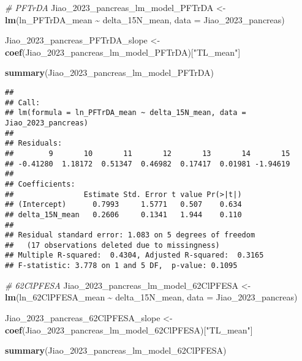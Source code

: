 \documentclass[
]{article}
\newenvironment{Shaded}{\begin{snugshade}}{\end{snugshade}}
\newcommand{\AttributeTok}[1]{\textcolor[rgb]{0.13,0.29,0.53}{#1}}
\newcommand{\CommentTok}[1]{\textcolor[rgb]{0.56,0.35,0.01}{\textit{#1}}}
\newcommand{\FunctionTok}[1]{\textcolor[rgb]{0.13,0.29,0.53}{\textbf{#1}}}
\newcommand{\NormalTok}[1]{#1}
\newcommand{\OtherTok}[1]{\textcolor[rgb]{0.56,0.35,0.01}{#1}}
\newcommand{\SpecialCharTok}[1]{\textcolor[rgb]{0.81,0.36,0.00}{\textbf{#1}}}
\newcommand{\StringTok}[1]{\textcolor[rgb]{0.31,0.60,0.02}{#1}}
\begin{document}
\begin{Shaded}
\begin{Highlighting}[]
\CommentTok{\# PFTrDA}
\NormalTok{Jiao\_2023\_pancreas\_lm\_model\_PFTrDA }\OtherTok{\textless{}{-}} \FunctionTok{lm}\NormalTok{(ln\_PFTrDA\_mean }\SpecialCharTok{\textasciitilde{}}\NormalTok{ delta\_15N\_mean,}
                                    \AttributeTok{data =}\NormalTok{ Jiao\_2023\_pancreas)}

\NormalTok{Jiao\_2023\_pancreas\_PFTrDA\_slope }\OtherTok{\textless{}{-}} \FunctionTok{coef}\NormalTok{(Jiao\_2023\_pancreas\_lm\_model\_PFTrDA)[}\StringTok{"TL\_mean"}\NormalTok{]}


\FunctionTok{summary}\NormalTok{(Jiao\_2023\_pancreas\_lm\_model\_PFTrDA)}
\end{Highlighting}
\end{Shaded}

\begin{verbatim}
## 
## Call:
## lm(formula = ln_PFTrDA_mean ~ delta_15N_mean, data = Jiao_2023_pancreas)
## 
## Residuals:
##        9       10       11       12       13       14       15 
## -0.41280  1.18172  0.51347  0.46982  0.17417  0.01981 -1.94619 
## 
## Coefficients:
##                Estimate Std. Error t value Pr(>|t|)
## (Intercept)      0.7993     1.5771   0.507    0.634
## delta_15N_mean   0.2606     0.1341   1.944    0.110
## 
## Residual standard error: 1.083 on 5 degrees of freedom
##   (17 observations deleted due to missingness)
## Multiple R-squared:  0.4304, Adjusted R-squared:  0.3165 
## F-statistic: 3.778 on 1 and 5 DF,  p-value: 0.1095
\end{verbatim}

\begin{Shaded}
\begin{Highlighting}[]
\CommentTok{\# 62ClPFESA}
\NormalTok{Jiao\_2023\_pancreas\_lm\_model\_62ClPFESA }\OtherTok{\textless{}{-}} \FunctionTok{lm}\NormalTok{(ln\_62ClPFESA\_mean }\SpecialCharTok{\textasciitilde{}}\NormalTok{ delta\_15N\_mean,}
                                            \AttributeTok{data =}\NormalTok{ Jiao\_2023\_pancreas)}

\NormalTok{Jiao\_2023\_pancreas\_62ClPFESA\_slope }\OtherTok{\textless{}{-}} \FunctionTok{coef}\NormalTok{(Jiao\_2023\_pancreas\_lm\_model\_62ClPFESA)[}\StringTok{"TL\_mean"}\NormalTok{]}

\FunctionTok{summary}\NormalTok{(Jiao\_2023\_pancreas\_lm\_model\_62ClPFESA)}
\end{Highlighting}
\end{Shaded}
\end{document}
